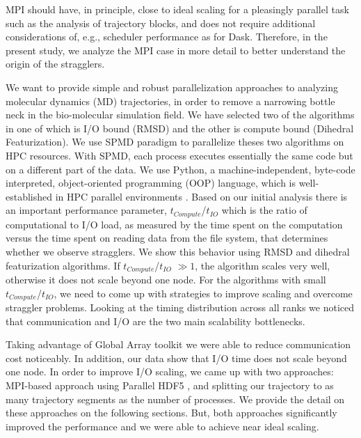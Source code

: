 MPI should have, in principle, close to ideal scaling for a pleasingly parallel task such as the analysis of trajectory blocks, and does not require additional considerations of, e.g., scheduler performance as for Dask. 
Therefore, in the present study, we analyze the MPI case in more detail to better understand the origin of the stragglers.

We want to provide simple and robust parallelization approaches to analyzing molecular dynamics (MD) trajectories, in order to remove a narrowing bottle neck in the bio-molecular simulation field. 
We have selected two of the algorithms in  one of which is I/O bound (RMSD) and the other is compute bound (Dihedral Featurization).
We use SPMD paradigm to parallelize theses two algorithms on HPC resources.
With SPMD, each process executes essentially the same code but on a different part of the data. 
We use Python, a machine-independent, byte-code interpreted, object-oriented programming (OOP) language, which is well-established in HPC parallel environments \cite{GAiN}. 
Based on our initial analysis there is an important performance parameter,  $t_{Compute}$/$t_{IO}$ which is the ratio of computational to I/O load, as measured by the time spent on the computation versus the time spent on reading data from the file system, that determines whether we observe stragglers.
We show this behavior using RMSD and dihedral featurization algorithms.
If $t_{Compute}$/$t_{IO}$  $\gg 1$, the algorithm scales very well, otherwise it does not scale beyond one node. 
For the algorithms with small $t_{Compute}$/$t_{IO}$, we need to come up with strategies to improve scaling and overcome straggler problems.
Looking at the timing distribution across all ranks we noticed that communication and I/O are the two main scalability bottlenecks.

Taking advantage of Global Array toolkit we were able to reduce communication cost noticeably.
In addition, our data show that I/O time does not scale beyond one node. 
In order to improve I/O scaling, we came up with two approaches: MPI-based approach using Parallel HDF5 \cite{pythonhdf5}, and splitting our trajectory to as many trajectory segments as the number of processes. 
We provide the detail on these approaches on the following sections.
But, both approaches significantly improved the performance and we were able to achieve near ideal scaling.